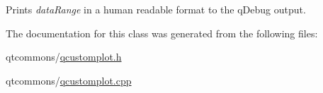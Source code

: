 Prints {\itshape data\+Range} in a human readable format to the q\+Debug output. 

The documentation for this class was generated from the following files\+:\begin{DoxyCompactItemize}
\item 
qtcommons/\mbox{\hyperlink{qcustomplot_8h}{qcustomplot.\+h}}\item 
qtcommons/\mbox{\hyperlink{qcustomplot_8cpp}{qcustomplot.\+cpp}}\end{DoxyCompactItemize}
